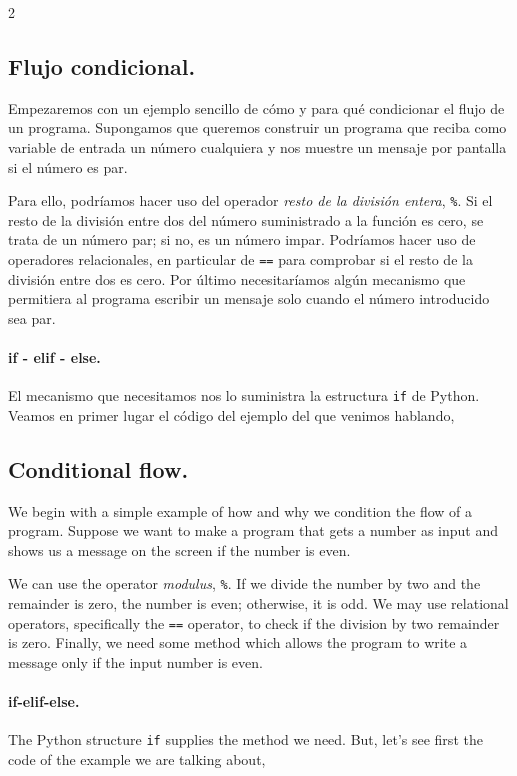 \begin{paracol}{2}
\subsection{Flujo condicional.}
Empezaremos con un ejemplo sencillo de cómo y para qué condicionar el flujo de un programa. Supongamos que queremos construir un programa que reciba como variable de entrada un número cualquiera y nos muestre un mensaje por pantalla si el número es par.

Para ello, podríamos hacer uso del operador \emph{resto de la división entera}, \texttt{\%}. Si el resto de la división entre dos del número suministrado a la función es cero, se trata de un número par; si no, es un número impar. Podríamos hacer uso de operadores relacionales, en particular de \texttt{==} para comprobar si el resto de la división entre dos es cero. Por último necesitaríamos algún mecanismo que permitiera al programa escribir un mensaje solo cuando el número introducido sea par.

\paragraph{if - elif - else.} El mecanismo que necesitamos nos lo suministra la estructura \texttt{if} de Python. Veamos en primer lugar el código del ejemplo del que venimos hablando,
\switchcolumn
\subsection{Conditional flow.} 
We begin with a simple example of how and why we condition the flow of a program. Suppose we want to make a program that gets a number as input and shows us a message on the screen if the number is even.  

We can use the operator \emph{modulus}, \texttt{\%}. If we divide the number by two and the remainder is zero, the number is even; otherwise, it is odd. We may use relational operators, specifically the \texttt{==} operator, to check if the division by two remainder is zero. Finally, we need some method which allows the program to write a message only if the input number is even.

\paragraph{if-elif-else.} The Python structure \texttt{if} supplies the method we need. But, let's see first the code of the example we are talking about,
\end{paracol}

